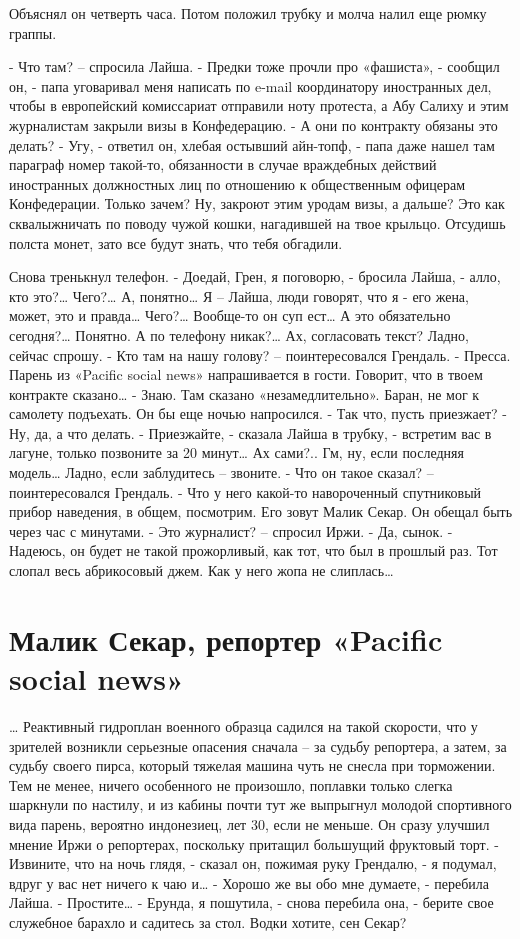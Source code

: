 \documentclass[10pt,final]{book}
\begin{document}
Объяснял он четверть часа. Потом положил трубку и молча налил еще рюмку граппы.

- Что там? -- спросила Лайша.
- Предки тоже прочли про «фашиста», - сообщил он, - папа уговаривал меня написать по e-mail координатору иностранных дел, чтобы в европейский комиссариат отправили ноту протеста, а Абу Салиху и этим журналистам закрыли визы в Конфедерацию.
- А они по контракту обязаны это делать?
- Угу, - ответил он, хлебая остывший айн-топф, - папа даже нашел там параграф номер такой-то, обязанности в случае враждебных действий иностранных должностных лиц по отношению к общественным офицерам Конфедерации. Только зачем? Ну, закроют этим уродам визы, а дальше? Это как сквалыжничать по поводу чужой кошки, нагадившей на твое крыльцо. Отсудишь полста монет, зато все будут знать, что тебя обгадили.

Снова тренькнул телефон.
- Доедай, Грен, я поговорю, - бросила Лайша, - алло, кто это?\ldots{} Чего?\ldots{} А, понятно\ldots{} Я -- Лайша, люди говорят, что я - его жена, может, это и правда\ldots{} Чего?\ldots{} Вообще-то он суп ест\ldots{} А это обязательно сегодня?\ldots{} Понятно. А по телефону никак?\ldots{} Ах, согласовать текст? Ладно, сейчас спрошу.
- Кто там на нашу голову? -- поинтересовался Грендаль.
- Пресса. Парень из «Pacific social news» напрашивается в гости. Говорит, что в твоем контракте сказано\ldots{}
- Знаю. Там сказано «незамедлительно». Баран, не мог к самолету подъехать. Он бы еще ночью напросился.
- Так что, пусть приезжает?
- Ну, да, а что делать.
- Приезжайте, - сказала Лайша в трубку, - встретим вас в лагуне, только позвоните за 20 минут\ldots{} Ах сами?.. Гм, ну, если последняя модель\ldots{} Ладно, если заблудитесь -- звоните.
- Что он такое сказал? -- поинтересовался Грендаль.
- Что у него какой-то навороченный спутниковый прибор наведения, в общем, посмотрим. Его зовут Малик Секар. Он обещал быть через час с минутами.
- Это журналист? -- спросил Иржи.
- Да, сынок.
- Надеюсь, он будет не такой прожорливый, как тот, что был в прошлый раз. Тот слопал весь абрикосовый джем. Как у него жопа не слиплась\ldots{}



\chapter{Малик Секар, репортер «Pacific social news»}


\ldots{} Реактивный гидроплан военного образца садился на такой скорости, что у зрителей возникли серьезные опасения сначала -- за судьбу репортера, а затем, за судьбу своего пирса, который тяжелая машина чуть не снесла при торможении. Тем не менее, ничего особенного не произошло, поплавки только слегка шаркнули по настилу, и из кабины почти тут же выпрыгнул молодой спортивного вида парень, вероятно индонезиец, лет 30, если не меньше. Он сразу улучшил мнение Иржи о репортерах, поскольку притащил большущий фруктовый торт.
- Извините, что на ночь глядя, - сказал он, пожимая руку Грендалю, - я подумал, вдруг у вас нет ничего к чаю и\ldots{}
- Хорошо же вы обо мне думаете, - перебила Лайша.
- Простите\ldots{}
- Ерунда, я пошутила, - снова перебила она, - берите свое служебное барахло и садитесь за стол. Водки хотите, сен Секар?
\end{document}

